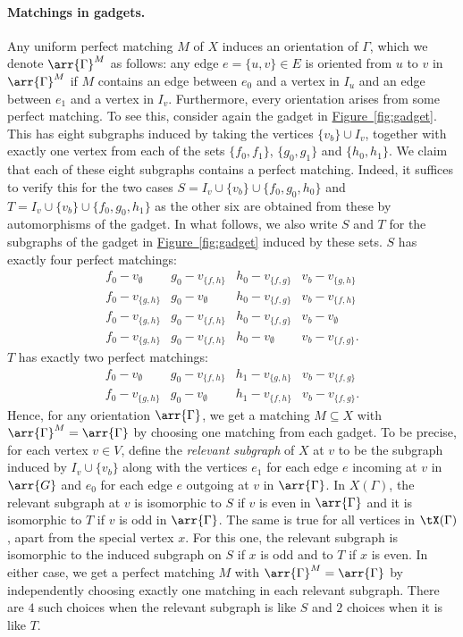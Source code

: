\documentclass[11pt]{article}
\newcommand{\expref}[2]{\texorpdfstring{\hyperref[#2]{#1~\ref{#2}}}{#1~\ref{#2}}}
\begin{document}
\paragraph{Matchings in gadgets.}
Any uniform perfect matching $M$ of $X$ induces an orientation of $\Gamma$, which we
denote $\arr{\Gamma}^M$ as follows: any edge $e=\{u,v\} \in E$ is oriented from $u$
to $v$ in $\arr{\Gamma}^M$ if $M$ contains an edge between $e_0$ and a vertex in
$I_u$ and an edge between $e_1$ and a vertex in $I_v$.
Furthermore, every orientation arises from some perfect matching. To see this,
consider again the gadget in \expref{Figure}{fig:gadget}. This has eight subgraphs
induced by taking the vertices $\{v_b\} \cup I_v$, together with exactly one
vertex from each of the sets $\{f_0,f_1\}$, $\{g_0,g_1\}$ and $\{h_0,h_1\}$. We
claim that each of these eight subgraphs contains a perfect matching. Indeed, it
suffices to verify this for the two cases $S = I_v \cup \{v_b\} \cup
\{f_0,g_0,h_0\}$ and $T = I_v \cup \{v_b\} \cup \{f_0,g_0,h_1\}$ as the other
six are obtained from these by automorphisms of the gadget. In what follows, we
also write $S$ and $T$ for the subgraphs of the gadget in
\expref{Figure}{fig:gadget} induced by these sets.
$S$ has exactly four perfect matchings:
$$
\begin{array}{cccc}
  f_0 - v_{\emptyset} & g_0 - v_{\{f,h\}} & h_0 - v_{\{f,g\}} & v_b - v_{\{g,h\}} \\
  f_0 - v_{\{g,h\}}  & g_0 -  v_{\emptyset}  & h_0 - v_{\{f,g\}}  & v_b - v_{\{f,h\}}  \\
  f_0 - v_{\{g,h\}}  & g_0 - v_{\{f,h\}}  & h_0 - v_{\{f,g\}}  & v_b - v_{\emptyset}\\
  f_0 - v_{\{g,h\}}  & g_0 - v_{\{f,h\}}  & h_0 - v_{\emptyset}  & v_b - v_{\{f,g\}}.
\end{array}
$$
$T$ has exactly two perfect matchings:
$$
\begin{array}{cccc}
  f_0 - v_{\emptyset} & g_0 - v_{\{f,h\}} &  h_1 - v_{\{g,h\}}  & v_b - v_{\{f,g\}}  \\
  f_0 - v_{\{g,h\}}  & g_0 -  v_{\emptyset}   & h_1 - v_{\{f,h\}}  & v_b -  v_{\{f,g\}}. 
\end{array}
$$
Hence, for any orientation $\arr{\Gamma}$, we get a matching $M \subseteq X$ with
$\arr{\Gamma}^M = \arr{\Gamma}$ by choosing one matching from each gadget. To be precise,
for each vertex $v \in V$, define the \emph{relevant subgraph} of $X$ at $v$ to
be the subgraph induced by $I_v \cup \{v_b\}$ along with the vertices $e_1$ for
each edge $e$ incoming at $v$ in $\arr{G}$ and $e_0$ for each edge $e$ outgoing
at $v$ in $\arr{\Gamma}$. In $X(\Gamma)$, the relevant subgraph at $v$ is isomorphic to
$S$ if $v$ is even in $\arr{\Gamma}$ and it is isomorphic to $T$ if $v$ is odd in
$\arr{\Gamma}$. The same is true for all vertices in $\tX(\Gamma)$, apart from the special
vertex $x$. For this one, the relevant subgraph is isomorphic to the induced subgraph on $S$ if $x$ is
odd and to $T$ if $x$ is even. In either case, we get a perfect matching $M$
with $\arr{\Gamma}^M = \arr{\Gamma}$ by independently choosing exactly one matching in
each relevant subgraph. There are $4$ such choices when the relevant subgraph is
like $S$ and $2$ choices when it is like $T$.
\end{document}
